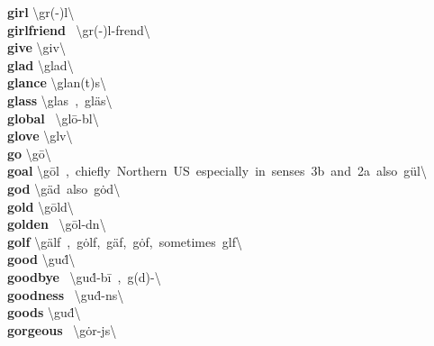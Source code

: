 \documentclass[10pt,a4paper]{article}
\begin{document}
\begin{multicols}{2}
\textbf{ girl }\quad \textbackslash \textprimstress g\textschwa r(-\textschwa )l\textbackslash \\
\textbf{ girlfriend }\quad \ \textbackslash \textprimstress g\textschwa r(-\textschwa )l-\textsecstress frend\textbackslash \\
\textbf{ give }\quad \textbackslash \textprimstress giv\textbackslash \\
\textbf{ glad }\quad \textbackslash \textprimstress glad\textbackslash \\
\textbf{ glance }\quad \textbackslash \textprimstress glan(t)s\textbackslash \\
\textbf{ glass }\quad \textbackslash \textprimstress glas\ ,\ \textprimstress gl\"{a}s\textbackslash \\
\textbf{ global }\quad \ \textbackslash \textprimstress gl\={o}-b\textschwa l\textbackslash \\
\textbf{ glove }\quad \textbackslash \textprimstress gl\textschwa v\textbackslash \\
\textbf{ go }\quad \textbackslash \textprimstress g\={o}\textbackslash \\
\textbf{ goal }\quad \textbackslash \textprimstress g\={o}l\ ,\ chiefly\ Northern\ US\ especially\ in\ senses\ 3b\ and\ 2a\ also\ \textprimstress g\"{u}l\textbackslash \\
\textbf{ god }\quad \textbackslash \textprimstress g\"{a}d\ also\ \textprimstress g\.{o}d\textbackslash \\
\textbf{ gold }\quad \textbackslash \textprimstress g\={o}ld\textbackslash \\
\textbf{ golden }\quad \ \textbackslash \textprimstress g\={o}l-d\textschwa n\textbackslash \\
\textbf{ golf }\quad \textbackslash \textprimstress g\"{a}lf\ ,\ \textprimstress g\.{o}lf,\ \textprimstress g\"{a}f,\ \textprimstress g\.{o}f,\ sometimes\ \textprimstress g\textschwa lf\textbackslash \\
\textbf{ good }\quad \textbackslash \textprimstress gu\. d\textbackslash \\
\textbf{ goodbye }\quad \ \textbackslash gu\. d-\textprimstress b\={i}\ ,\ g\textschwa (d)-\textbackslash \\
\textbf{ goodness }\quad \ \textbackslash \textprimstress gu\. d-n\textschwa s\textbackslash \\
\textbf{ goods }\quad \textbackslash \textprimstress gu\. d\textbackslash \\
\textbf{ gorgeous }\quad \ \textbackslash \textprimstress g\.{o}r-j\textschwa s\textbackslash \\

\end{multicols}
\end{document}
